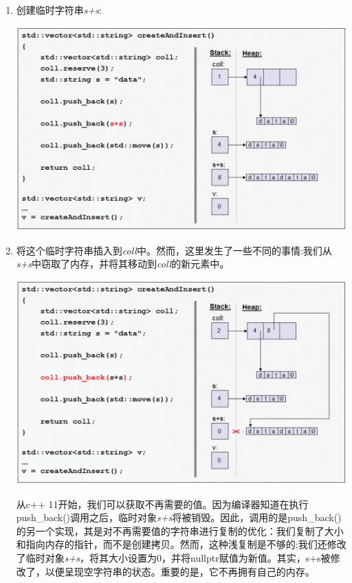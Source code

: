 \begin{itemize}
\begin{enumerate}
		\item 创建临时字符串\textit{s+s}:\par
		\begin{center}
			\includegraphics[width=1.0\textwidth]{content/1/chapter1/images/11}
		\end{center}
		\item 将这个临时字符串插入到\textit{coll}中。然而，这里发生了一些不同的事情:我们从\textit{s+s}中窃取了内存，并将其移动到\textit{coll}的新元素中。\par
		\begin{center}
			\includegraphics[width=1.0\textwidth]{content/1/chapter1/images/12}
		\end{center}
		从c++ 11开始，我们可以获取不再需要的值。因为编译器知道在执行push\_back()调用之后，临时对象\textit{s+s}将被销毁。因此，调用的是push\_back()的另一个实现，其是对不再需要值的字符串进行复制的优化：我们复制了大小和指向内存的指针，而不是创建拷贝。然而，这种浅复制是不够的;我们还修改了临时对象\textit{s+s}，将其大小设置为0，并将nullptr赋值为新值。其实，s+s被修改了，以便呈现空字符串的状态。重要的是，它不再拥有自己的内存。

\end{enumerate}
\end{itemize}
